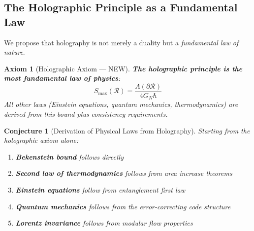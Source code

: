 \documentclass[12pt,a4paper]{article}
\newtheorem{conjecture}[theorem]{Conjecture}
\newtheorem{axiom}[theorem]{Axiom}
\begin{document}
\subsection{The Holographic Principle as a Fundamental Law}

We propose that holography is not merely a duality but a \textit{fundamental law of nature}.

\begin{axiom}[Holographic Axiom --- NEW]
\textbf{The holographic principle is the most fundamental law of physics}:
\begin{equation}
S_{\text{max}}(\mathcal{R}) = \frac{A(\partial \mathcal{R})}{4 G_N \hbar}
\end{equation}
All other laws (Einstein equations, quantum mechanics, thermodynamics) are \textit{derived} from this bound plus consistency requirements.
\end{axiom}

\begin{conjecture}[Derivation of Physical Laws from Holography]
Starting from the holographic axiom alone:
\begin{enumerate}
    \item \textbf{Bekenstein bound} follows directly
    \item \textbf{Second law of thermodynamics} follows from area increase theorems
    \item \textbf{Einstein equations} follow from entanglement first law
    \item \textbf{Quantum mechanics} follows from the error-correcting code structure
    \item \textbf{Lorentz invariance} follows from modular flow properties
\end{enumerate}
\end{conjecture}
\end{document}
